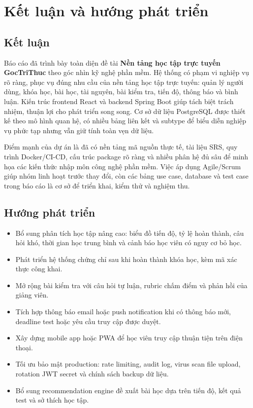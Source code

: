 \documentclass[12pt,a4paper]{report}
\newcommand{\topic}{Nền tảng học tập trực tuyến GocTriThuc}
\begin{document}
\chapter{Kết luận và hướng phát triển}

\section{Kết luận}
Báo cáo đã trình bày toàn diện đề tài \textbf{\topic} theo góc nhìn kỹ nghệ phần mềm. Hệ thống có phạm vi nghiệp vụ rõ ràng, phục vụ đúng nhu cầu của nền tảng học tập trực tuyến: quản lý người dùng, khóa học, bài học, tài nguyên, bài kiểm tra, tiến độ, thông báo và bình luận. Kiến trúc frontend React và backend Spring Boot giúp tách biệt trách nhiệm, thuận lợi cho phát triển song song. Cơ sở dữ liệu PostgreSQL được thiết kế theo mô hình quan hệ, có nhiều bảng liên kết và subtype để biểu diễn nghiệp vụ phức tạp nhưng vẫn giữ tính toàn vẹn dữ liệu.

Điểm mạnh của dự án là đã có nền tảng mã nguồn thực tế, tài liệu SRS, quy trình Docker/CI-CD, cấu trúc package rõ ràng và nhiều phân hệ đủ sâu để minh họa các kiến thức nhập môn công nghệ phần mềm. Việc áp dụng Agile/Scrum giúp nhóm linh hoạt trước thay đổi, còn các bảng use case, database và test case trong báo cáo là cơ sở để triển khai, kiểm thử và nghiệm thu.

\section{Hướng phát triển}
\begin{itemize}
  \item Bổ sung phân tích học tập nâng cao: biểu đồ tiến độ, tỷ lệ hoàn thành, câu hỏi khó, thời gian học trung bình và cảnh báo học viên có nguy cơ bỏ học.
  \item Phát triển hệ thống chứng chỉ sau khi hoàn thành khóa học, kèm mã xác thực công khai.
  \item Mở rộng bài kiểm tra với câu hỏi tự luận, rubric chấm điểm và phản hồi của giảng viên.
  \item Tích hợp thông báo email hoặc push notification khi có thông báo mới, deadline test hoặc yêu cầu truy cập được duyệt.
  \item Xây dựng mobile app hoặc PWA để học viên truy cập thuận tiện trên điện thoại.
  \item Tối ưu bảo mật production: rate limiting, audit log, virus scan file upload, rotation JWT secret và chính sách backup dữ liệu.
  \item Bổ sung recommendation engine đề xuất bài học dựa trên tiến độ, kết quả test và sở thích học tập.
\end{itemize}
\end{document}
